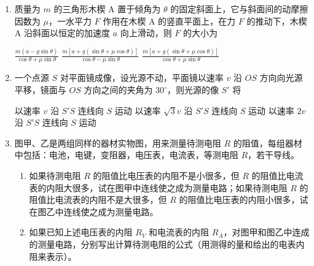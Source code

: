 \documentclass[\gkver]{gaokaozhenti}
\begin{document}
\begin{enumerate}
{总能得到较大的像}
{可能得到放大的像，也可能得到缩小的像}
{可能得到放大的像，也可能得不到像}

\item
质量为 $m$ 的三角形木楔 A 置于倾角为 $\theta$ 的固定斜面上，它与斜面间的动摩擦因数为 $\mu$，一水平力 $F$ 作用在木楔 A 的竖直平面上，在力 $F$ 的推动下，木楔 A 沿斜面以恒定的加速度 $a$ 向上滑动，则 $F$ 的大小为


{$\frac{m(a - g\sin \theta )}{\cos \theta  + \mu \sin \theta }$}
{$\frac{m[a + g(\sin \theta  + \mu \cos \theta )]}{\cos \theta  - \mu \sin \theta }$}
{$\frac{m[a + g(\sin \theta  + \mu \cos \theta )]}{\cos \theta  + \mu \sin \theta }$}

\item
一个点源 $S$ 对平面镜成像，设光源不动，平面镜以速率 $v$ 沿 $OS$ 方向向光源平移，镜面与 $OS$ 方向之间的夹角为 $30^\circ$，则光源的像 $S'$ 将


{以速率 $v$ 沿 $S'S$ 连线向 $S$ 运动}
{以速率 $\sqrt{3}v$ 沿 $S'S$ 连线向 $S$ 运动}
{以速率 $2v$ 沿 $S'S$ 连线向 $S$ 运动}

\item
图甲、乙是两组同样的器材实物图，用来测量待测电阻 $R$ 的阻值，每组器材中包括：电池，电键，变阻器，电压表，电流表，等测电阻 $R$，若干导线。

\begin{enumerate}
	\item
	如果待测电阻 $R$ 的阻值比电压表的内阻不是小很多，但 $R$ 的阻值比电流表的内阻大很多，试在图甲中连线使之成为测量电路；如果待测电阻 $R$ 的阻值比电流表的内阻不是大很多，但 $R$ 的阻值比电压表的内阻小很多，试在图乙中连线使之成为测量电路。
	\item
	如果已知上述电压表的内阻 $R_{V}$ 和电流表的内阻 $R_{A}$，对图甲和图乙中连成的测量电路，分别写出计算待测电阻的公式（用测得的量和给出的电表内阻来表示）。
\end{enumerate}


\end{enumerate}
\end{document}
